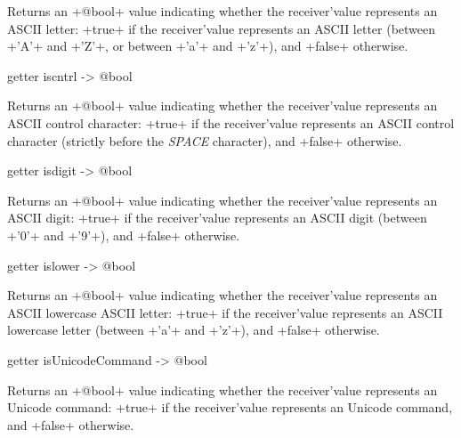 Returns an \ggsq+@bool+ value indicating whether the receiver'value represents an ASCII letter: \ggsq+true+ if the receiver'value represents an ASCII letter (between \ggsq+'A'+ and \ggsq+'Z'+, or between \ggsq+'a'+ and \ggsq+'z'+), and \ggsq+false+ otherwise.





\begin{galgas4}
getter iscntrl -> @bool
\end{galgas4}

Returns an \ggsq+@bool+ value indicating whether the receiver'value represents an ASCII control character: \ggsq+true+ if the receiver'value represents an ASCII control character (strictly before the \emph{SPACE} character), and \ggsq+false+ otherwise.






\begin{galgas4}
getter isdigit -> @bool
\end{galgas4}

Returns an \ggsq+@bool+ value indicating whether the receiver'value represents an ASCII digit: \ggsq+true+ if the receiver'value represents an ASCII digit (between \ggsq+'0'+ and \ggsq+'9'+), and \ggsq+false+ otherwise.






\begin{galgas4}
getter islower -> @bool
\end{galgas4}

Returns an \ggsq+@bool+ value indicating whether the receiver'value represents an ASCII lowercase ASCII letter: \ggsq+true+ if the receiver'value represents an ASCII lowercase letter (between \ggsq+'a'+ and \ggsq+'z'+), and \ggsq+false+ otherwise.







\begin{galgas4}
getter isUnicodeCommand -> @bool
\end{galgas4}

Returns an \ggsq+@bool+ value indicating whether the receiver'value represents an Unicode command: \ggsq+true+ if the receiver'value represents an Unicode command, and \ggsq+false+ otherwise.






